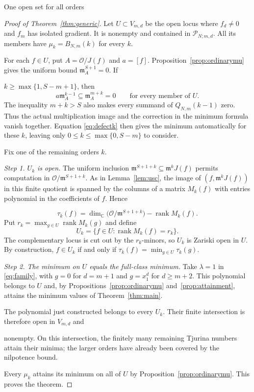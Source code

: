 \documentclass[12pt,reqno]{amsart}
\makeatletter
\renewcommand\subsection{\@startsection{subsection}{2}%
  \z@{.8\linespacing\@plus.3\linespacing}{.35\linespacing}%
  {\normalfont\bfseries}}
\newcommand{\C}{\mathbb C}
\newcommand{\mm}{\mathfrak m}
\newcommand{\rank}{\operatorname{rank}}
\newcommand{\Pclass}{\mathcal P_{N;m,d}}
\newcommand{\OO}{\mathcal O}
\theoremstyle{definition}
\makeatother
\begin{document}
 


\subsection{One open set for all orders}

 

 
\begin{proof}[Proof of Theorem~\ref{thm:generic}]
Let $U\subset V_{m,d}$ be the open locus
where $f_d\ne0$ and $f_m$ has isolated gradient.
It is nonempty and contained in $\Pclass$.
All its members have $\mu_k=B_{N,m}(k)$ for every $k$.

For each $f\in U$, put $A=\OO/J(f)$ and $a=[f]$.
Proposition~\ref{prop:ordinarymu} gives the uniform bound
$\mm_A^{S+1}=0$. If

$k\geq\max\{1,S-m+1\}$, then
\[
 a\mm_A^{k-1}\subseteq\mm_A^{m+k}=0
 \qquad\text{for every member of }U.
\]
The inequality $m+k>S$ also makes every summand of
$Q_{N,m}(k-1)$
zero. Thus the actual multiplication image and the correction in
the minimum formula vanish together. Equation \eqref{eq:defectk}
then gives the minimum automatically for these $k$, leaving only
$0\leq k\leq\max\{0,S-m\}$ to consider.

Fix one of the remaining orders $k$.


\emph{Step 1. $U_k$ is open.}
The uniform inclusion
$\mm^{S+1+k}\subseteq\mm^kJ(f)$ permits computation in
$\OO/\mm^{S+1+k}$. As in Lemma~\ref{lem:usc}, the image of
$(f,\mm^kJ(f))$ in this finite quotient is spanned by the columns of
a matrix $M_k(f)$ with entries polynomial in the coefficients of $f$.
Hence

\[
 \tau_k(f)=\dim_\C\bigl(\OO/\mm^{S+1+k}\bigr)-\rank M_k(f).
\]
Put $r_k=\max_{g\in U}\rank M_k(g)$ and define
\[
 U_k=\{f\in U:\rank M_k(f)=r_k\}.
\]
The complementary locus is cut out by the $r_k$-minors, so
$U_k$ is Zariski open in $U$. By construction, $  f\in U_k $ if and only if  
$\tau_k(f)=\min_{g\in U}\tau_k(g)$.

\emph{Step 2. The minimum on $U$ equals the full-class minimum.}
Take $\lambda=1$ in \eqref{eq:family}, with $g=0$ for $d=m+1$ and
$g=x_1^d$ for $d\geq m+2$. This polynomial belongs to $U$ and, by
Propositions~\ref{prop:ordinarymu} and~\ref{prop:attainment},
attains the minimum values of Theorem~\ref{thm:main}.


The polynomial just constructed belongs to every $U_k$.
Their finite intersection is therefore open in $V_{m,d}$ and

nonempty. On this intersection, the finitely many remaining Tjurina
numbers attain their minima; the larger orders have already been
covered by the nilpotence bound.

Every $\mu_k$ attains its minimum on all of $U$ by
Proposition~\ref{prop:ordinarymu}. This proves the theorem.
\end{proof}
\end{document}
